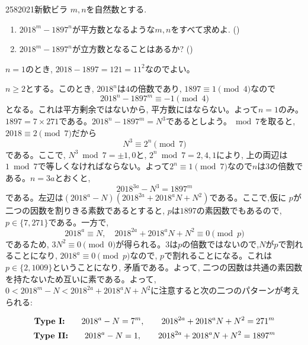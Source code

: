 \begin{thm}{258}{}{2021新歓ビラ}
$m,n$を自然数とする. 
\begin{enumerate}
\item $2018^{m} - 1897^{n}$が平方数となるような$m,n$をすべて求めよ. ()
\item $2018^{m} - 1897^{n}$が立方数となることはあるか? ()
\end{enumerate}
\end{thm}

$n=1$のとき, $2018 - 1897 = 121 = 11^2$なのでよい。\par 
$n\geq 2$とする。このとき, $2018^{n}$は$4$の倍数であり, $1897\equiv 1\pmod{4}$なので
\[2018^{n} - 1897^{m} \equiv -1\pmod{4}\]
となる。これは平方剰余ではないから, 平方数にはならない。よって$n=1$のみ。
$1897 = 7\times 271$である。$2018^{n} - 1897^{m} = N^3$であるとしよう。$\bmod{7}$を取ると, $2018 \equiv 2\pmod{7}$だから
\[N^3 \equiv 2^{n}\pmod{7}\]
である。ここで, $N^3\bmod{7}  = \pm 1, 0$と, $2^{n} \bmod{7} = 2,4,1$により, 上の両辺は$1\bmod{7}$で等しくなければならない。よって$2^{n} \equiv  1\pmod{7}$なので$n$は$3$の倍数である。$n=3a$とおくと, 
\[2018^{3a} - N^3 = 1897^{m}\]
である。左辺は$(2018^a - N)(2018^{2a} + 2018^{a}N + N^2)$である。ここで,仮に $p$が二つの因数を割りきる素数であるとすると, $p$は$1897$の素因数でもあるので, $p\in \{ 7,271\}$である。一方で, 
\[2018^{a} \equiv N,\quad 2018^{2a} + 2018^{a}N + N^2 \equiv 0\pmod{p}\]
であるため, $3N^2 \equiv 0\pmod{0}$が得られる。$3$は$p$の倍数ではないので,$N$が$p$で割れることになり, $2018^{a} \equiv 0\pmod{p}$なので, $p$で割れることになる。これは$p\in \{ 2,1009 \}$ということになり, 矛盾である。よって, 二つの因数は共通の素因数を持たないため互いに素である。よって, $0 < 2018^{m} - N < 2018^{2a} + 2018^{a}N + N^2$に注意すると次の二つのパターンが考えられる:
\begin{screen} 
\[\text{\textbf{Type I:}}\qquad 2018^{a} - N = 7^{m},\qquad 2018^{2a} + 2018^{a}N + N^2 = 271^{m}\]
\[\text{\textbf{Type II:}}\qquad 2018^{a} - N = 1,\qquad 2018^{2a} + 2018^{a}N + N^2 = 1897^{m}\]
\end{screen}

